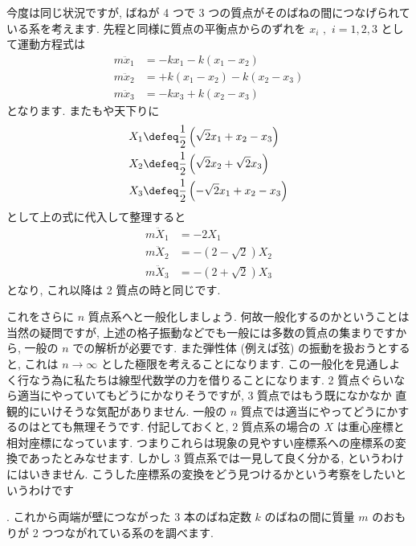 \documentclass[openany, a4paper, oneside]{jsbook}
\begin{document}
{今度は同じ状況ですが, ばねが 4 つで 3 つの質点がそのばねの間につなげられている系を考えます.
先程と同様に質点の平衡点からのずれを $x_{i}\,\,,\,\,i=1,2,3$ として運動方程式は
\begin{align}
m\ddot{x}_{1} &= -kx_1 - k (x_1 - x_2 ) \\
m\ddot{x}_{2} &= + k (x_1 - x_2 ) - k (x_2 - x_3) \\
m\ddot{x}_{3} &= -kx_3 +k (x_2 - x_3 )
\end{align}
となります. またもや天下りに
\begin{align}
X_1 &\defeq \frac{1}{2} \left ( \sqrt{2}x_1 + x_2 - x_3 \right) \\
X_2 &\defeq \frac{1}{2} \left ( \sqrt{2}x_2 + \sqrt{2}x_3 \right) \\
X_3 &\defeq \frac{1}{2} \left ( -\sqrt{2}x_1 + x_2 - x_3 \right)
\end{align}
として上の式に代入して整理すると
\begin{align}
m\ddot{X}_1 &= -2X_1 \\
m\ddot{X}_2 &= -(2 - \sqrt{2}) X_2 \\
m\ddot{X}_3 &= -(2 + \sqrt{2}) X_3
\end{align}
となり, これ以降は 2 質点の時と同じです.

これをさらに $n$ 質点系へと一般化しましょう. 何故一般化するのかということは当然の疑問ですが,
上述の格子振動などでも一般には多数の質点の集まりですから, 一般の $n$ での解析が必要です.
また弾性体 (例えば弦) の振動を扱おうとすると, これは $n\rightarrow \infty$ とした極限を考えることになります.
この一般化を見通しよく行なう為に私たちは線型代数学の力を借りることになります.
2 質点ぐらいなら適当にやっていてもどうにかなりそうですが, 3 質点ではもう既になかなか
直観的にいけそうな気配がありません. 一般の $n$ 質点では適当にやってどうにかするのはとても無理そうです.
付記しておくと,  $2$ 質点系の場合の $X$ は重心座標と相対座標になっています.
つまりこれらは現象の見やすい座標系への座標系の変換であったとみなせます.
しかし $3$ 質点系では一見して良く分かる, というわけにはいきません.
こうした座標系の変換をどう見つけるかという考察をしたいというわけです \footnotemark}.
これから両端が壁につながった 3 本のばね定数 $k$ のばねの間に質量 $m$ のおもりが 2 つつながれている系のを調べます.
\end{document}
